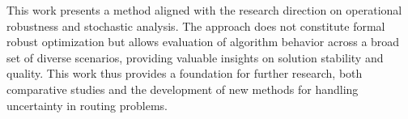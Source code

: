 This work presents a method aligned with the research direction on operational robustness and stochastic analysis. The approach does not constitute formal robust optimization but allows evaluation of algorithm behavior across a broad set of diverse scenarios, providing valuable insights on solution stability and quality. This work thus provides a foundation for further research, both comparative studies and the development of new methods for handling uncertainty in routing problems.